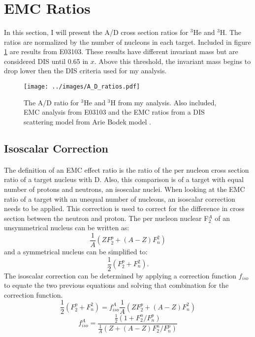 \section{EMC Ratios}
\paragraph{}In this section, I will present the A/D cross section ratios for $^3$He and $^3$H. The ratios are normalized by the number of nucleons in each target. Included in figure \ref{ADplot} are results from E03103. These results have different invariant mass but are considered DIS until 0.65 in $x$. Above this threshold, the invariant mass begins to drop lower then the DIS criteria used for my analysis. 


\begin{figure}[t]
	\centering
	\texttt{[image: ../images/A\_D\_ratios.pdf]}
	\caption{The A/D ratio for $^3$He and $^3$H from my analysis. Also included, EMC analysis from E03103\cite{seeley} and the EMC ratios from a DIS scattering model from Arie Bodek model \cite{DISmodel}.}
	\label{ADplot}
\end{figure}



\subsection{Isoscalar Correction}
	\paragraph{}The definition of an EMC effect ratio is the ratio of the per nucleon cross section ratio of a target nucleus with D. Also,  this comparison is of a target with equal number of protons and neutrons, an isoscalar nuclei. When looking at the EMC ratio of a target with an unequal number of nucleons, an isoscalar correction needs to be applied. This correction is used to correct for the difference in cross section between the neutron and proton. The per nucleon nuclear F$_2^A $ of an unsymmetrical nucleus can be written as:
	\begin{equation}
	\frac{1}{A}\left(ZF^p_2 + \left(A-Z\right)F^2_n\right)\nonumber
	\end{equation}
	and a symmetrical nucleus can be simplified to:
	\begin{equation}
		\frac{1}{2}\left(F^p_2 + F^2_n\right).\nonumber
	\end{equation}	
	The isoscalar correction can be determined by applying a correction function $f_{iso}$ to equate the two previous equations and solving that combination for the correction function.
	\begin{equation}
		\frac{1}{2}\left(F^p_2 + F^2_n\right) =  f^A_{iso}\frac{1}{A}\left(ZF^p_2 + \left(A-Z\right)F^2_n\right)\nonumber
	\end{equation}
	\begin{equation}
	f^A_{iso} = \frac{\frac{1}{2}\left(1+F^n_2/F^p_n\right)}{\frac{1}{A}\left(Z +(A-Z)F^n_2/F^p_n\right)} \label{isoC}
	\end{equation}
